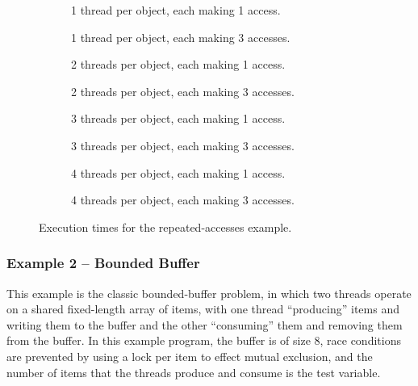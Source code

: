 \documentclass[12pt,a4paper,twoside,openright]{report}
\newenvironment{figtile} %
{\begin{subfigure}{0.48\textwidth}
		\def\svgwidth{\textwidth}
		\captionsetup{font=footnotesize}
	}
	{\end{subfigure}}
\begin{document}
\begin{figure}
	\centering
	\footnotesize
	\begin{figtile}
		
		\caption{1 thread per object,
			each making 1 access.}
	\end{figtile}%
	\quad
	\begin{figtile}
		
		\caption{1 thread per object,
			each making 3 accesses.}
	\end{figtile}
	\begin{figtile}
		
		\caption{2 threads per object,
			each making 1 access.}
	\end{figtile}%
	\quad
	\begin{figtile}
		
		\caption{2 threads per object,
			each making 3 accesses.}
	\end{figtile}
	\begin{figtile}
		
		\caption{3 threads per object,
			each making 1 access.}
	\end{figtile}%
	\quad
	\begin{figtile}
		
		\caption{3 threads per object,
			each making 3 accesses.}
	\end{figtile}
	\begin{figtile}
		
		\caption{4 threads per object,
			each making 1 access.}
	\end{figtile}%
	\quad
	\begin{figtile}
		
		\caption{4 threads per object,
			each making 3 accesses.}
		\label{fig:repeated-access-time-h}
	\end{figtile}
	\caption{Execution times for the repeated-accesses example.}
	\label{fig:repeated-access-time}
\end{figure}

\subsubsection{Example 2 -- Bounded Buffer}
This example is the classic bounded-buffer problem,
in which two threads operate on a shared fixed-length
array of items, with one thread ``producing'' items
and writing them to the buffer and the other
``consuming'' them and removing them from the buffer.
In this example program, the buffer is of size 8,
race conditions are prevented by using a lock per
item to effect mutual exclusion, and the number
of items that the threads produce and consume is
the test variable.
\end{document}
